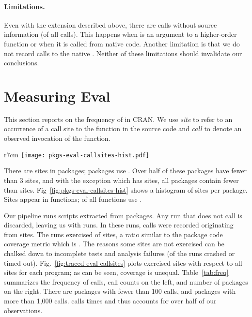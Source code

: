 \documentclass[acmsmall, screen]{acmart}
\begin{document}
\paragraph{Limitations.} Even with the extension described above, there are
\PkgUndefinedRnd \eval calls without source information (\PkgUndefinedRatio of
all \eval calls). This happens when \eval is an argument to a higher-order
function or when it is called from native code. Another limitation is that we do
not record calls to the native \eval. Neither of these limitations should
invalidate our conclusions.

\section{Measuring Eval}

This section reports on the frequency of \eval in CRAN. We use \emph{site} to
refer to an occurrence of a call site to the \eval function in the source code
and \emph{call} to denote an observed invocation of the \eval function.

\begin{wrapfigure}{r}{7cm}
	\hspace*{-1cm}\texttt{[image: pkgs-eval-callsites-hist.pdf]}
	\caption{ \eval call sites}\label{fig:pkgs-eval-callsites-hist}
\end{wrapfigure}

There are \PkgEvalCallSites \eval sites in \PkgPackages packages;
\PkgPackagesRatio packages use \eval. Over half of these packages have fewer
than 3 sites, and with the exception \MaxEvalCallSitesPackage which has
\MaxEvalCallSitesCount sites, all packages contain fewer than
\MaxEvalCallSitesRest sites. Fig~\ref{fig:pkgs-eval-callsites-hist} shows a
histogram of sites per package. Sites appear in \PkgFunsWithEval functions;
\CranFunsWithEvalRatio of all functions use \eval.



Our pipeline runs \CranRunnableScripts scripts extracted from \CranPackages
packages. Any run that does not call \eval is discarded, leaving us with
\packageNbruns runs. In these runs, \packageAllcalls \eval calls were recorded
originating from \PkgHitEvalCallSites sites. The runs exercised
\PkgHitEvalCallSitesAvgRatio of sites, a ratio similar to the package code
coverage metric which is \PkgCodeCoverage. The reasons some sites are not
exercised can be chalked down to incomplete tests and analysis failures
(\PkgFailedProgramsRatio of the runs crashed or timed out).
Fig.~\ref{fig:traced-eval-callsites} plots exercised sites with respect to all
sites for each program; as can be seen, coverage is unequal.
Table~\ref{tab:freq} summarizes the frequency of calls, call counts on the left, and
number of packages on the right. There are \packageFewcalls packages with fewer
than 100 calls, and \packageManycalls packages with more than 1,000 calls.
\packageMaxcallspack calls \eval \packageMaxcalls times and thus accounts for
over half of our observations.
\end{document}
